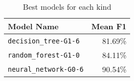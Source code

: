\begin{table}[H]
\centering
\capstart
\begin{tabularx}{0.48\textwidth}{|X|r|}
\hline
Model Name & Mean F1 \\
\hline
\texttt{decision\_tree-G1-6} & 81.69\% \\
\texttt{random\_forest-G1-0} & 84.11\% \\
\texttt{neural\_network-G0-6} & 90.54\% \\
\hline
\end{tabularx}
\caption{Best models for each kind}
\label{tab:best_model_per_kind}

\end{table}
